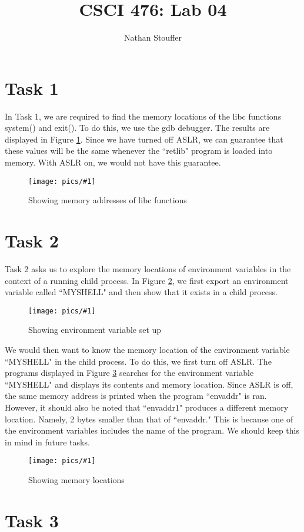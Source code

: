 \documentclass[11pt]{article}
\newcommand{\fig}[2]{ 
\begin{figure}[h]
	\centering
	\caption{#2}
	\texttt{[image: pics/\#1]}
	\label{fig:#1}
\end{figure} 
}
\begin{document}
\title{CSCI 476: Lab 04}
\author{Nathan Stouffer}
\maketitle
\newpage

\section*{Task 1}

In Task 1, we are required to find the memory locations of the libc functions system() and exit(). To do this, we use the gdb debugger. The results are displayed in Figure \ref{fig:task1}. Since we have turned off ASLR, we can guarantee that these values will be the same whenever the ``retlib" program is loaded into memory. With ASLR on, we would not have this guarantee.

\fig{task1}{Showing memory addresses of libc functions}


\newpage

\section*{Task 2}

Task 2 asks us to explore the memory locations of environment variables in the context of a running child process. In Figure \ref{fig:task2.1}, we first export an environment variable called ``MYSHELL" and then show that it exists in a child process.

\fig{task2.1}{Showing environment variable set up}

We would then want to know the memory location of the environment variable ``MYSHELL" in the child process. To do this, we first turn off ASLR. The programs displayed in Figure \ref{fig:task2.2} searches for the environment variable ``MYSHELL" and displays its contents and memory location. Since ASLR is off, the same memory address is printed when the program ``envaddr" is ran. However, it should also be noted that ``envaddr1" produces a different memory location. Namely, 2 bytes smaller than that of ``envaddr." This is because one of the environment variables includes the name of the program. We should keep this in mind in future tasks.

\fig{task2.2}{Showing memory locations}

\newpage

\section*{Task 3}
\end{document}
